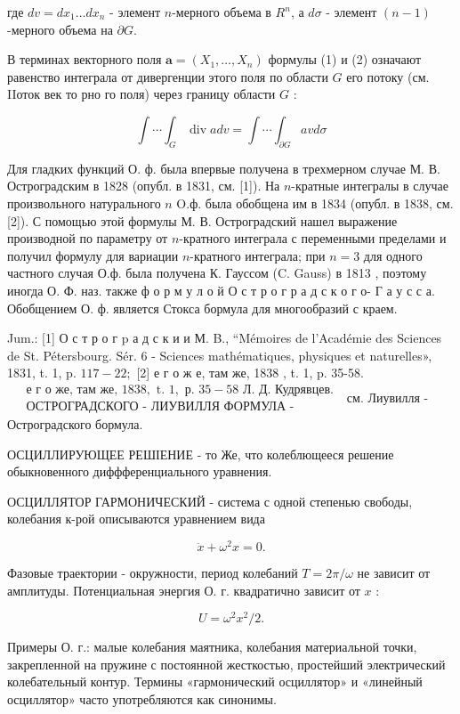 \documentclass[10pt]{article}
\begin{document}
где $d v=d x_{1} \ldots d x_{n}$ - элемент $n$-мерного объема в $R^{n}$, а $d \sigma$ - элемент $(n-1)$-мерного объема на $\partial G$.

В терминах векторного поля $\boldsymbol{a}=\left(X_{1}, \ldots, X_{n}\right)$ формулы (1) и (2) означают равенство интеграла от дивергенции этого поля по области $G$ его потоку (см. IIоток век то рно го поля) через границу области $G$ :

\[
\int \cdots \int_{G} \operatorname{div} a d v=\int \cdots \int_{\partial G} a v d \sigma
\]

Для гладких функций О. ф. была впервые получена в трехмерном случае М. В. Остроградским в 1828 (опубл. в 1831, см. [1]). На $n$-кратные интегралы в случае произвольного натурального $n$ O.ф. была обобщена им в 1834 (опубл. в 1838, см. [2]). С помощью этой формулы М. В. Остроградский нашел выражение производной по параметру от $n$-кратного интеграла с переменными пределами и получил формулу для вариации $n$-кратного интеграла; при $n=3$ для одного частного случая О.ф. была получена К. Гауссом (C. Gauss) в 1813 , поэтому иногда О. Ф. наз. также ф о р м у л о й О с т р о г р а д с к о г о- Г а у с с а. Обобщением О. ф. является Стокса бормула для многообразий с краем.

Jum.: [1] О с т р о г p а д с к и и М. B., “Mémoires de l'Académie des Sciences de St. Pétersbourg. Sér. 6 - Sciences mathématiques, physiques et naturelles», 1831, t. 1, p. $117-22 ;$ [2]
е г о ж е, там же, 1838 , t. 1, p. 35-58. $\begin{aligned} & \text { е г о же, там же, } 1838, \text { t. } 1, \text { р. } 35-58 \text { Л. Д. Кудрявцев. } \\ & \text { ОСТРОГРАДСКОГО - ЛИУВИЛЛЯ ФОРМУЛА - }\end{aligned}$ см. Лиувилля - Остроградского бормула.

ОСЦИЛЛИРУЮЩЕЕ РЕШІЕНИЕ - то Же, что колеблющееся решение обыкновенного диффференциального уравнения.

ОСЦИЛЛЯТОР ГАРМОНИЧЕСКИЙ - система с одной степенью свободы, колебания к-рой описываются уравнением вида

\[
\ddot{x}+\omega^{2} x=0 .
\]

Фазовые траектории - окружности, период колебаний $T=2 \pi / \omega$ не зависит от амплитуды. Потенциальная энергия О. г. квадратично зависит от $x$ :

\[
U=\omega^{2} x^{2} / 2 .
\]

Примеры О. г.: малые колебания маятника, колебания материальной точки, закрепленной на пружине с постоянной жесткостью, простейший электрический колебательный контур. Термины «гармонический осциллятор» и «линейный осциллятор» часто употребляются как синонимы.
\end{document}

